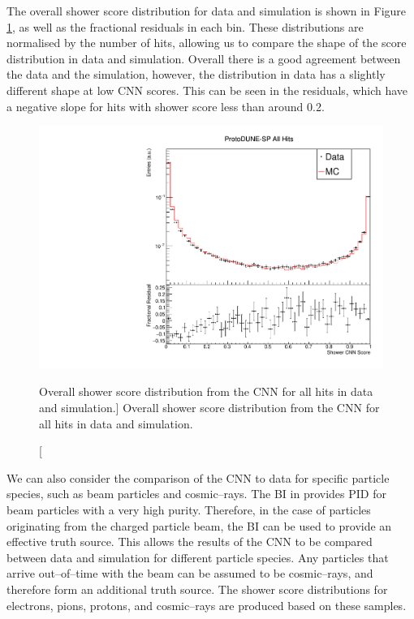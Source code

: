The overall shower score distribution for data and simulation is shown in 
Figure \ref{fig:cnn_overall_score}, as well as the fractional residuals in 
each bin. These distributions are normalised by the number of hits, allowing us
to compare the shape of the score distribution in data and simulation.  
Overall there is a good agreement between the data and the simulation, 
however, the distribution in data has a slightly different shape at low CNN
scores. This can be seen in the residuals, which have a negative slope for 
hits with shower score less than around 0.2.
\begin{figure}
	\centering
	\includegraphics[width=\textwidth]{figures/hit_cnn_all.pdf}
	\caption
	[Overall shower score distribution from the CNN for all hits in data and simulation.]
	{Overall shower score distribution from the CNN for all hits in data and simulation.}
	\label{fig:cnn_overall_score}
\end{figure}

We can also consider the comparison of the CNN to data for specific particle 
species, such as beam particles and cosmic--rays.  The BI in \protodune{} 
provides PID for beam particles with a very high purity. Therefore, in the 
case of particles originating from the charged particle beam, the BI can be 
used to provide an effective truth source. This allows the results of the CNN 
to be compared between data and simulation for different particle species. Any 
particles that arrive out--of--time with the beam can be assumed to be 
cosmic--rays, and therefore form an additional truth source. The shower score 
distributions for electrons, pions, protons, and cosmic--rays are produced 
based on these samples. 

